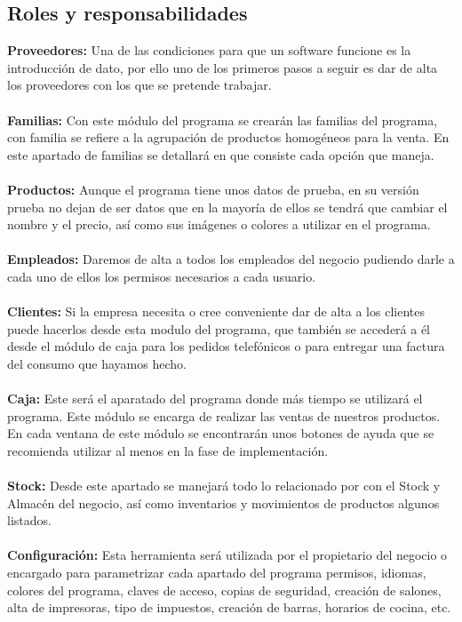 \documentclass[12pt,a4paper]{article}
\begin{document}
\subsection{Roles y responsabilidades}
\textbf {Proveedores:} Una de las condiciones para que un software funcione es la introducción de dato, por ello uno de los primeros pasos a seguir es dar de alta los proveedores con los que se pretende trabajar.\\\\
\textbf {Familias:} Con este módulo del programa se crearán las familias del programa, con familia se refiere a la agrupación de productos homogéneos para la venta. En este apartado de familias se detallará en que consiste cada opción que maneja.\\\\
\textbf {Productos:} Aunque el programa tiene unos datos de prueba, en su versión prueba no dejan de ser datos que en la mayoría de ellos se tendrá que cambiar el nombre y el precio, así como sus imágenes o colores a utilizar en el programa.\\\\
\textbf {Empleados:} Daremos de alta a todos los empleados del negocio pudiendo darle a cada uno de ellos los permisos necesarios a cada usuario.\\\\
\textbf {Clientes:} Si la empresa necesita o cree conveniente dar de alta a los clientes puede hacerlos desde esta modulo del programa, que también se accederá a él desde el módulo de caja para los pedidos telefónicos o para entregar una factura del consumo que hayamos hecho.\\\\
\textbf {Caja:} Este será el aparatado del programa donde más tiempo se utilizará el programa. Este módulo se encarga de realizar las ventas de nuestros productos. En cada ventana de este módulo se encontrarán unos botones de ayuda que se recomienda utilizar al menos en la fase de implementación.\\\\
\textbf {Stock:} Desde este apartado se manejará todo lo relacionado por con el Stock y Almacén del negocio, así como inventarios y movimientos de productos algunos listados.\\\\
\textbf {Configuración:} Esta herramienta será utilizada por el propietario del negocio o encargado para parametrizar cada apartado del programa permisos, idiomas, colores del programa, claves de acceso, copias de seguridad, creación de salones, alta de impresoras, tipo de impuestos, creación de barras, horarios de cocina, etc.\\\\
\end{document}
